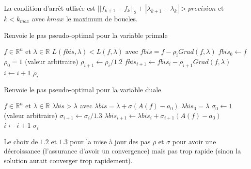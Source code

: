 \documentclass[10pt,a4paper]{article}
\newcommand{\R}{\mathbb{R}}
\theoremstyle{plain}
\theoremstyle{definition}
\begin{document}
La condition d'arrêt utlisée est $||f_{k+1}-f_k||_2 + |\lambda_{k+1}-\lambda_k| > precision$ et $k < k_{max}$ avec $kmax$ le maximum de boucles.

\begin{algorithm}
\caption{Renvoie le pas pseudo-optimal pour la variable primale}

\begin{algorithmic}
	\REQUIRE $f \in \R^n$ et $\lambda \in \R$ 
	\ENSURE $L(fbis,\lambda) < L(f,\lambda)$ avec $fbis = f - \rho_i Grad(f,\lambda)$
	\STATE $fbis_0 \leftarrow f$
	\STATE $\rho_0 = 1$ (valeur arbitraire)
		\STATE $\rho_{i+1} \leftarrow \rho_i / 1.2$
		\STATE $fbis_{i+1} \leftarrow fbis_i - \rho_{i+1} Grad(f,\lambda)$
		\STATE $i \leftarrow i+1$
	\ENDWHILE
	\RETURN $\rho_i$
\end{algorithmic}

\end{algorithm}

\begin{algorithm}
\caption{Renvoie le pas pseudo-optimal pour la variable duale}

\begin{algorithmic}
	\REQUIRE $f \in \R^n$ et $\lambda \in \R$ 
	\ENSURE $\lambda bis > \lambda$ avec $\lambda bis = \lambda + \sigma (A(f)-a_0)$
	\STATE $\lambda bis_0 = \lambda$
	\STATE $\sigma_0 \leftarrow 1$ (valeur arbitraire)
		\STATE $\sigma_{i+1} \leftarrow \sigma_i / 1.3$
		\STATE $\lambda bis_{i+1} \leftarrow \lambda bis_i + \sigma_{i+1} (A(f)-a_0)$
		\STATE $i \leftarrow i+1$
	\ENDWHILE
	\RETURN $\sigma_i$
\end{algorithmic}

\end{algorithm}

Le choix de $1.2$ et $1.3$ pour la mise à jour des pas $\rho$ et $\sigma$ pour avoir une décroissance (l'assurance d'avoir un convergence) mais pas trop rapide (sinon la solution aurait converger trop rapidement).



\end{document}
